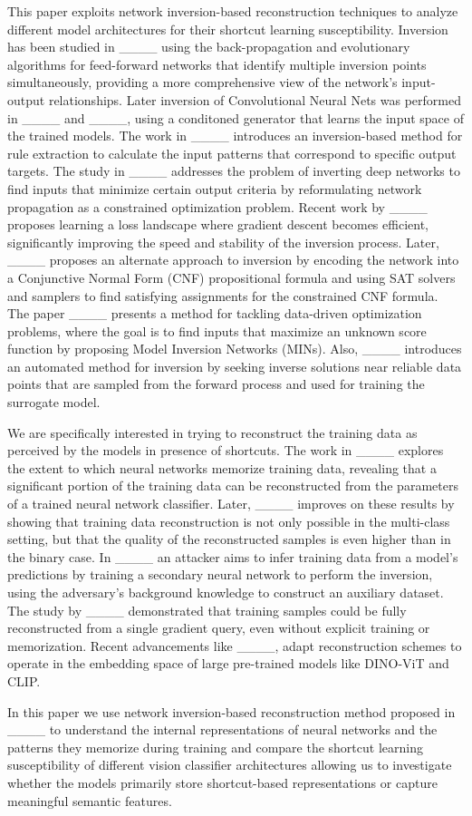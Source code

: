 This paper exploits network inversion-based reconstruction techniques to analyze different model architectures for their shortcut learning susceptibility. Inversion has been studied in ____ using the back-propagation and evolutionary algorithms for feed-forward networks that identify multiple inversion points simultaneously, providing a more comprehensive view of the network’s input-output relationships. Later inversion of Convolutional Neural Nets was performed in ____ and ____, using a conditoned generator that learns the input space of the trained models. The work in ____ introduces an inversion-based method for rule extraction to calculate the input patterns that correspond to specific output targets. The study in ____ addresses the problem of inverting deep networks to find inputs that minimize certain output criteria by reformulating network propagation as a constrained optimization problem. Recent work by ____ proposes learning a loss landscape where gradient descent becomes efficient, significantly improving the speed and stability of the inversion process. Later, ____ proposes an alternate approach to inversion by encoding the network into a Conjunctive Normal Form (CNF) propositional formula and using SAT solvers and samplers to find satisfying assignments for the constrained CNF formula. The paper ____ presents a method for tackling data-driven optimization problems, where the goal is to find inputs that maximize an unknown score function by proposing Model Inversion Networks (MINs). Also, ____ introduces an automated method for inversion by seeking inverse solutions near reliable data points that are sampled from the forward process and used for training the surrogate model.

We are specifically interested in trying to reconstruct the training data as perceived by the models in presence of shortcuts. The work in ____ explores the extent to which neural networks memorize training data, revealing that a significant portion of the training data can be reconstructed from the parameters of a trained neural network classifier. Later, ____ improves on these results by showing that training data reconstruction is not only possible in the multi-class setting, but that the quality of the reconstructed samples is even higher than in the binary case. In ____ an attacker aims to infer training data from a model's predictions by training a secondary neural network to perform the inversion, using the adversary's background knowledge to construct an auxiliary dataset. The study by ____ demonstrated that training samples could be fully reconstructed from a single gradient query, even without explicit training or memorization. Recent advancements like ____, adapt reconstruction schemes to operate in the embedding space of large pre-trained models like DINO-ViT and CLIP.

In this paper we use network inversion-based reconstruction method proposed in ____ to understand the internal representations of neural networks and the patterns they memorize during training and compare the shortcut learning susceptibility of different vision classifier architectures allowing us to investigate whether the models primarily store shortcut-based representations or capture meaningful semantic features.